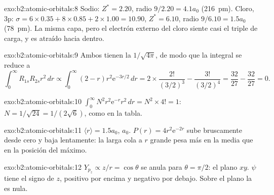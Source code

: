 \begin{solution}{exo:b2:atomic-orbitals:8}
Sodio: $Z^* = 2.20$, radio $9/2.20 = 4.1a_0$ (\qty{216}{pm}). Cloro, 3p:
$\sigma = 6 \times 0.35 + 8 \times 0.85 + 2 \times 1.00 = 10.90$, $Z^* = 6.10$, radio
$9/6.10 = 1.5a_0$ (\qty{78}{pm}). La misma capa, pero el electrón externo del cloro
siente casi el triple de carga, y es atraído hacia dentro.
\end{solution}

\begin{solution}{exo:b2:atomic-orbitals:9}
Ambos tienen la  $1/\sqrt{4\pi}$, de modo que la integral se reduce a
\[
  \int_0^\infty R_{1s}R_{2s}r^2\,dr \propto \int_0^\infty (2 - r)r^2\mathrm e^{-3r/2}\,dr =
  2 \times \frac{2!}{(3/2)^3} - \frac{3!}{(3/2)^4} = \frac{32}{27} - \frac{32}{27} = 0 .
\]
\end{solution}

\begin{solution}{exo:b2:atomic-orbitals:10}
$\int_0^\infty N^2r^2\mathrm e^{-r}r^2\,dr = N^2 \times 4! = 1$: $N = 1/\sqrt{24} =
1/(2\sqrt6)$, como en la tabla.
\end{solution}

\begin{solution}{exo:b2:atomic-orbitals:11}
$\langle r\rangle = 1.5a_0$,  $a_0$. $P(r) = 4r^2\mathrm e^{-2r}$ sube
bruscamente desde cero y baja lentamente: la larga cola a $r$ grande pesa más en la
media que en la posición del máximo.
\end{solution}

\begin{solution}{exo:b2:atomic-orbitals:12}
$Y_{p_z} \propto z/r = \cos\theta$ se anula para $\theta = \pi/2$: el plano $xy$.
$\psi$ tiene el signo de $z$, positivo por encima y negativo por debajo. Sobre el plano la
 es nula.
\end{solution}

